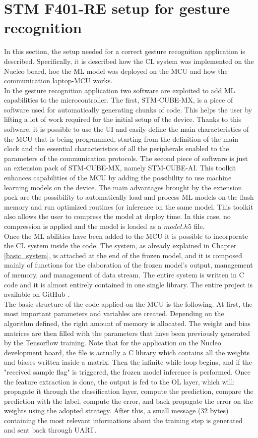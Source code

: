 \documentclass[12pt]{report}
\begin{document}
\section{STM F401-RE setup for gesture recognition}
In this section, the setup needed for a correct gesture recognition application is described. Specifically, it is described how the CL system was implemented on the Nucleo board, hoe the ML model was deployed on the MCU and how the communication laptop-MCU works.\\
In the gesture recognition application two software are exploited to add ML capabilities to the microcontroller. The first, STM-CUBE-MX, is a piece of software used for automatically generating chunks of code. This helps the user by lifting a lot of work required for the initial setup of the device. Thanks to this software, it is possible to use the UI and easily define the main characteristics of the MCU that is being programmed, starting from the definition of the main clock and the essential characteristics of all the peripherals enabled to the parameters of the communication protocols. The second piece of software is just an extension pack of STM-CUBE-MX, namely STM-CUBE-AI. This toolkit enhances capabilities of the MCU by adding the possibility to use machine learning models on the device. The main advantages brought by the extension pack are the possibility to automatically load and process ML models on the flash memory and run optimized routines for inference on the same model. This toolkit also allows the user to compress the model at deploy time. In this case, no compression is applied and the model is loaded as a $model.h5$ file.\\
Once the ML abilities have been added to the MCU it is possible to incorporate the CL system inside the code. The system, as already explained in Chapter \ref{basic_system}, is attached at the end of the frozen model, and it is composed mainly of functions for the elaboration of the frozen model's output, management of memory, and management of data stream. The entire system is written in C code and it is almost entirely contained in one single library. The entire project is available on GitHub \cite{github_repo}.\\
The basic structure of the code applied on the MCU is the following. At first, the most important parameters and variables are created. Depending on the algorithm defined, the right amount of memory is allocated. The weight and bias matrices are then filled with the parameters that have been previously generated by the Tensorflow training. Note that for the application on the Nucleo development board, the file is actually a C library which contains all the weights and biases written inside a matrix. Then the infinite while loop begins, and if the "received sample flag" is triggered, the frozen model inference is performed. Once the feature extraction is done, the output is fed to the OL layer, which will: propagate it through the classification layer, compute the prediction, compare the prediction with the label, compute the error, and back propagate the error on the weights using the adopted strategy. After this, a small message (32 bytes) containing the most relevant informations about the training step is generated and sent back through UART.\\
\end{document}
